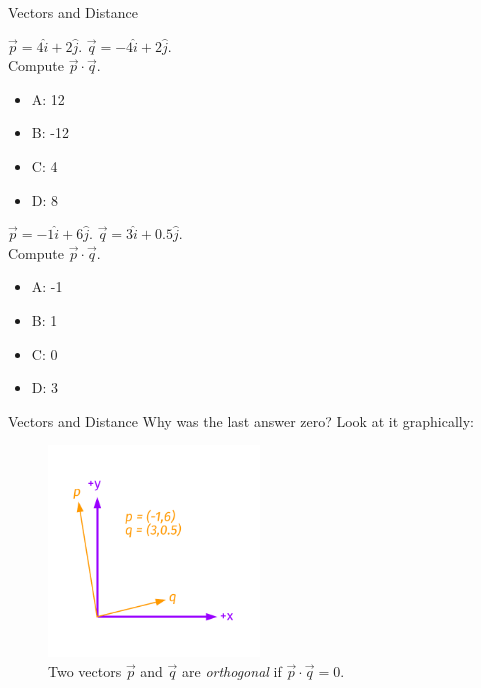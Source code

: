\documentclass{beamer}
\begin{document}
\begin{frame}{Vectors and Distance}
\small
\begin{minipage}[b]{0.45\linewidth}
$\vec{p} = 4\hat{i}+2\hat{j}$.  $\vec{q} = -4\hat{i}+2\hat{j}$.  \\
Compute $\vec{p} \cdot \vec{q}$.
\vspace{0.2cm}
\begin{itemize}
\item A: 12
\item B: -12
\item C: 4
\item D: 8
\end{itemize}
\end{minipage}
\hspace{0.5cm}
\begin{minipage}[b]{0.45\linewidth}
$\vec{p} = -1\hat{i}+6\hat{j}$.  $\vec{q} = 3\hat{i}+0.5\hat{j}$.  \\
Compute $\vec{p} \cdot \vec{q}$.
\vspace{0.2cm}
\begin{itemize}
\item A: -1
\item B: 1
\item C: 0
\item D: 3
\end{itemize}
\end{minipage}
\end{frame}

\begin{frame}{Vectors and Distance}
Why was the last answer zero?  Look at it graphically:
\begin{figure}
\centering
\includegraphics[width=0.5\textwidth,trim=1cm 1cm 1cm 1cm,clip=true]{figures/Vectors5.pdf}
\caption{\label{fig:twovectors4} Two vectors $\vec{p}$ and $\vec{q}$ are \textit{orthogonal} if $\vec{p} \cdot \vec{q} = 0$.}
\end{figure}
\end{frame}
\end{document}
